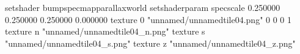 setshader bumpspecmapparallaxworld
setshaderparam specscale 0.250000 0.250000 0.250000 0.000000
texture 0 "unnamed/unnamedtile04.png" 0 0 0 1
texture n "unnamed/unnamedtile04_n.png"
texture s "unnamed/unnamedtile04_s.png"
texture z "unnamed/unnamedtile04_z.png"